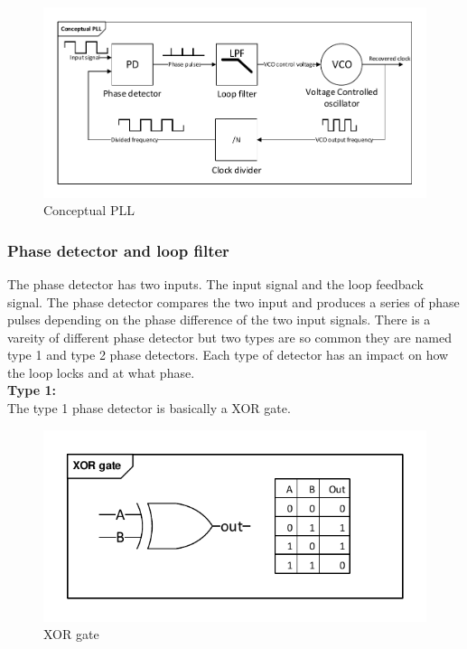\begin{figure}[H]
	\centering
	\includegraphics[width=.9\textwidth]{billeder/10technologystudies/conceptualpll}
	\caption{Conceptual PLL}
	\label{fig:conceptualpll}
\end{figure}

\subsubsection{Phase detector and loop filter}
The phase detector has two inputs. The input signal and the loop feedback signal. The phase detector compares the two input and produces a series of phase pulses depending on the phase difference of the two input signals. There is a vareity of different phase detector but two types are so common they are named type 1 and type 2 phase detectors. Each type of detector has an impact on how the loop locks and at what phase.
\\ \textbf{Type 1:}\\
The type 1 phase detector is basically a XOR gate. 

\begin{figure}[H]
	\centering
	\includegraphics[width=.6\textwidth]{billeder/10technologystudies/XORgate}
	\caption{XOR gate}
	\label{fig:XOR}
\end{figure}

